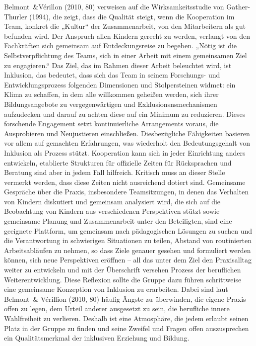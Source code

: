Belmont~\&Vérillon (2010, 80) verweisen auf die Wirksamkeitsstudie von Gather-Thurler (1994), die zeigt, dass die Qualität steigt, wenn die Kooperation im Team, konkret die „Kultur“ der Zusammenarbeit, von den Mitarbeitern als gut befunden wird.  
Der Anspruch allen Kindern gerecht zu werden, verlangt von den Fachkräften sich gemeinsam auf Entdeckungsreise zu begeben. „Nötig ist die Selbstverpflichtung des Teams, sich in einer Arbeit mit einem gemeinsamen Ziel zu engagieren.“ Das Ziel, das im Rahmen dieser Arbeit beleuchtet wird, ist Inklusion, das bedeutet, dass sich das Team in seinem Forschungs- und Entwicklungsprozess folgenden Dimensionen und Stolpersteinen widmet: 
ein Klima zu schaffen, in dem alle willkommen geheißen werden, sich ihrer Bildungsangebote zu vergegenwärtigen und Exklusionsnsmechanismen aufzudecken und darauf zu achten diese auf ein Minimum zu reduzieren.
Dieses forschende Engagement setzt kontinuierliche Arrangements voraus, die Ausprobieren und Neujustieren einschließen. Diesbezügliche Fähigkeiten basieren vor allem auf gemachten Erfahrungen, was wiederholt den Bedeutungsgehalt von Inklusion als Prozess stützt. 
Kooperation kann sich in jeder Einrichtung anders entwickeln, etablierte Strukturen für offizielle Zeiten für Rücksprachen und Beratung sind aber in jedem Fall hilfreich. Kritisch muss an dieser Stelle vermerkt werden, dass diese Zeiten nicht ausreichend dotiert sind.
Gemeinsame Gespräche über die Praxis, insbesondere Teamsitzungen, in denen das Verhalten von Kindern diskutiert und gemeinsam analysiert wird, die sich auf die Beobachtung von Kindern aus verschiedenen Perspektiven stützt sowie gemeinsame Planung und Zusammenarbeit unter den Beteiligten, sind eine geeignete Plattform, um gemeinsam nach pädagogischen Lösungen zu suchen und die Verantwortung in schwierigen Situationen zu teilen, Abstand von routinierten Arbeitsabläufen zu nehmen, so dass Ziele genauer gesehen und formuliert werden können, sich neue Perspektiven eröffnen – all das unter dem Ziel den Praxisalltag weiter zu entwickeln und mit der Überschrift versehen Prozess der beruflichen Weiterentwicklung.
Diese Reflexion sollte die Gruppe dazu führen schrittweise eine gemeinsame Konzeption von Inklusion zu erarbeiten.
Dabei sind laut Belmont~\& Vérillion (2010, 80) häufig Ängste zu überwinden, die eigene Praxis offen zu legen, dem Urteil anderer ausgesetzt zu sein, die berufliche innere Wahlfreiheit zu verlieren. Deshalb ist eine Atmosphäre, die jedem erlaubt seinen Platz in der Gruppe zu finden und seine Zweifel und Fragen offen auszusprechen ein Qualitätsmerkmal der inklusiven Erziehung und Bildung.

